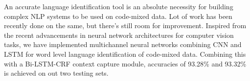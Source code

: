An accurate language identification tool is an absolute necessity for building complex NLP systems to be used on code-mixed data. Lot of work has been recently done on the same, but there's still room for improvement. Inspired from the recent advancements in neural network architectures for computer vision tasks, we have implemented multichannel neural networks combining CNN and LSTM for word level language identification of code-mixed data. Combining this with a Bi-LSTM-CRF context capture module, accuracies of 93.28\% and 93.32\% is achieved on out two testing sets.
